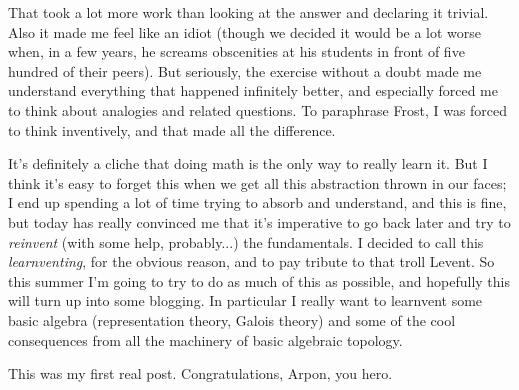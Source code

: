 That took a lot more work than looking at the answer and declaring it
trivial. Also it made me feel like an idiot (though we decided it
would be a lot worse when, in a few years, he screams obscenities at
his students in front of five hundred of their peers). But seriously,
the exercise without a doubt made me understand everything that
happened infinitely better, and especially forced me to think about
analogies and related questions. To paraphrase Frost, I was forced to
think inventively, and that made all the difference.

It's definitely a cliche that doing math is the only way to really
learn it. But I think it's easy to forget this when we get all this
abstraction thrown in our faces; I end up spending a lot of time
trying to absorb and understand, and this is fine, but today has
really convinced me that it's imperative to go back later and try to
\emph{reinvent} (with some help, probably...) the fundamentals. I
decided to call this \emph{learnventing}, for the obvious reason, and
to pay tribute to that troll Levent. So this summer I'm going to try
to do as much of this as possible, and hopefully this will turn up
into some blogging. In particular I really want to learnvent some
basic algebra (representation theory, Galois theory) and some of the
cool consequences from all the machinery of basic algebraic topology.

This was my first real post. Congratulations, Arpon, you hero.
